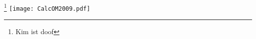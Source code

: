 \documentclass{article}
\begin{document}
\cite{book1} \cite{book2} \cite{book1,book2} \footnote{Kim ist doof}
\texttt{[image: CalcOM2009.pdf]}

\end{document}
